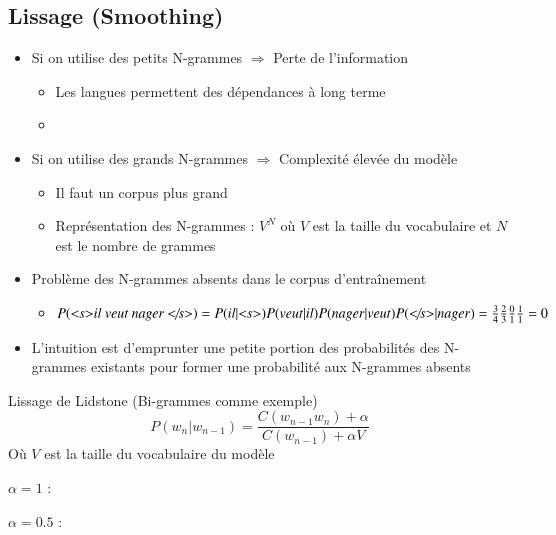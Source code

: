 \documentclass{KodeBook}
\begin{document}
\subsection{Lissage (Smoothing)}

\begin{itemize}
	
	\item Si on utilise des petits N-grammes $ \Longrightarrow $ Perte de l'information
	\begin{itemize}
		\item Les langues permettent des dépendances à long terme
		\item {}
	\end{itemize}
	
	\item Si on utilise des grands N-grammes $ \Longrightarrow $ Complexité élevée du modèle
	\begin{itemize}
		\item Il faut un corpus plus grand
		\item Représentation des N-grammes : $V^N$ où $V$ est la taille du vocabulaire et $N$ est le nombre de grammes
	\end{itemize}
	
	\item Problème des N-grammes absents dans le corpus d'entraînement
	\begin{itemize}
		\item $P(\text{\textit{\textless s\textgreater il veut nager \textless/s\textgreater}}) = 
		P(il|\text{\textit{\textless s\textgreater}}) P(veut|il) P(nager|veut)  P(\text{\textit{\textless/s\textgreater}}|nager) = 
		\frac{3}{4} \frac{2}{3} \frac{0}{1} \frac{1}{1} = 0
		$
	\end{itemize}
	\item L'intuition est d'emprunter une petite portion des probabilités des N-grammes existants pour former une probabilité aux N-grammes absents 
\end{itemize}

\begin{block}{Lissage de Lidstone (Bi-grammes comme exemple)}
	\[%
	P(w_n | w_{n-1}) = \frac{C(w_{n-1} w_n) + \alpha}{C(w_{n-1}) + \alpha V}
	\]
	Où $V$ est la taille du vocabulaire du modèle
	
	$\alpha = 1$ :  
	
	$\alpha = 0.5$ : 
\end{block}
\end{document}
